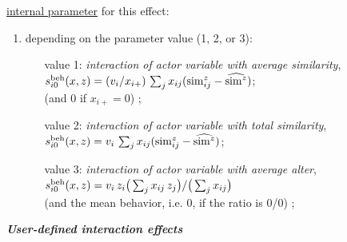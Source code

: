 \documentclass[a4paper,fleqn,11pt]{article}
\newcommand{\+}{\, + \,}
\newcommand{\vit}{\theenumi}
\newcounter{savenumi}
\begin{document}
\hyperlink{T_effpar}{internal parameter} for this effect:
\begin{enumerate}
\setcounter{enumi}{\value{savenumi}}
 \item depending on the parameter value (1, 2, or 3):
\begin{enumerate}
   \item[value 1:] {\em interaction of actor variable with average similarity},\\
 $s^{\rm beh}_{i\vit}(x, z) = (v_i / x_{i+}) \,
         \sum_j x_{ij} ({\rm sim}^z_{ij} - \widehat{{\rm sim}^z}) $;\\
    (and 0 if $x_{i+} = 0$) ;
   \item[value 2:] {\em interaction of actor variable with total similarity},\\
 $s^{\rm beh}_{i\vit}(x, z) = v_i \,
         \sum_j x_{ij} ({\rm sim}^z_{ij} - \widehat{{\rm sim}^z}) $;\\
   \item[value 3:] {\em interaction of actor variable with average alter},\\
 $s^{\rm beh}_{i\vit}(x, z) =  v_i \, z_i \big( \sum_j x_{ij}\, z_j \big)
                                / \big (\sum_j x_{ij}\big)  $\\
 (and the mean behavior, i.e. $0$, if the ratio is 0/0) ;
  \end{enumerate}
\end{enumerate}
\fi
\medskip

\noindent
\textbf{\emph{User-defined interaction effects}}
\medskip

\noindent
\end{document}
